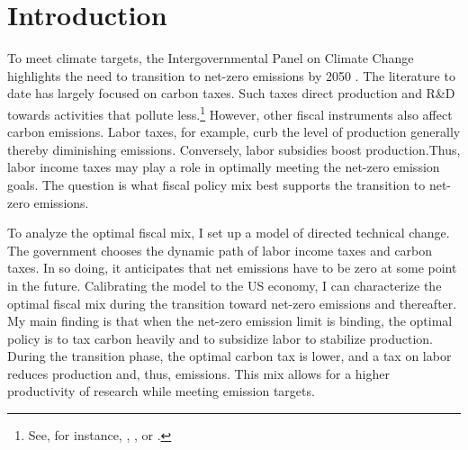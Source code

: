 \thispagestyle{empty}
\clearpage
\setcounter{page}{1}
\section{Introduction}




To meet climate targets, the Intergovernmental Panel on Climate Change highlights the need to transition to net-zero emissions by 2050 \citep{IPCC2022}.  The literature to date has largely focused on carbon taxes. Such taxes direct production and R\&D towards activities that pollute less.\footnote{ See, for instance, \cite{Acemoglu2012TheChange}, \cite{Golosov2014OptimalEquilibrium}, or \cite{Fried2018ClimateAnalysis}.} However, other fiscal instruments also affect carbon emissions. Labor taxes, for example, curb the level of production generally thereby diminishing emissions. Conversely, labor subsidies boost production.Thus, labor income taxes may play a role in optimally meeting the net-zero emission goals.  The question is what fiscal policy mix best supports the transition to net-zero emissions.

To analyze the optimal fiscal mix, I set up a model of directed technical change. The government chooses the dynamic path of labor income taxes and carbon taxes. In so doing, it anticipates that net emissions have to be zero  at some point in the future. Calibrating the model to the US economy, I can characterize the optimal fiscal mix during the transition toward net-zero emissions and thereafter. My main finding is that when the net-zero emission limit is binding, the optimal policy is to tax carbon heavily and to subsidize labor to stabilize production. During the transition phase, the optimal carbon tax is lower, and a tax on labor reduces production and, thus, emissions. This mix allows for a higher productivity of research while meeting emission targets.

